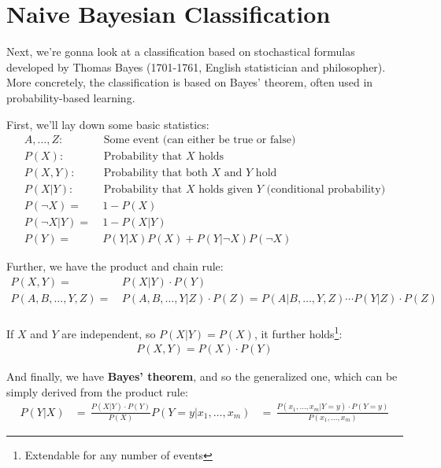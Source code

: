 \section{Naive Bayesian Classification}
\setcounter{figure}{0}

Next, we're gonna look at a classification based on stochastical formulas developed by Thomas Bayes (1701-1761, English statistician and philosopher). More concretely, the classification is based on Bayes' theorem, often used in probability-based learning.

First, we'll lay down some basic statistics:
\begin{align*}
  A, \dots, Z: & \text{ Some event (can either be true or false)}\\
  P(X): & \text{ Probability that }X\text{ holds}\\
  P(X, Y): & \text{ Probability that both }X\text{ and }Y\text{ hold}\\
  P(X | Y): & \text{ Probability that }X\text{ holds given }Y\text{ (conditional probability)}\\
  P(\neg X)=&\ 1-P(X)\\
  P(\neg X|Y)=&\ 1-P(X|Y)\\
  P(Y)=&\  P(Y|X)P(X) + P(Y|\neg X)P(\neg X)
\end{align*}

Further, we have the product and chain rule:
\begin{align*}
  P(X, Y) =&\, P(X|Y)\cdot P(Y)\\
  P(A, B, \dots, Y, Z) =&\, P(A, B, \dots, Y|Z)\cdot P(Z) = P(A|B,\dots, Y, Z)\cdots P(Y|Z) \cdot P(Z)\\
\end{align*}

If $X$ and $Y$ are independent, so $P(X|Y) = P(X)$, it further holds\footnote{Extendable for any number of events}:
\begin{align*}
  P(X, Y) = P(X)\cdot P(Y)
\end{align*}

And finally, we have \textbf{Bayes' theorem}, and so the generalized one, which can be simply derived from the product rule:
\begin{align*}
  P(Y|X) &=\, \frac{P(X|Y)\cdot P(Y)}{P(X)}
  P(Y=y|x_1, \dots, x_m) &=\, \frac{P(x_1, \dots, x_m | Y=y) \cdot P(Y=y)}{P(x_1, \dots, x_m)}
\end{align*}

